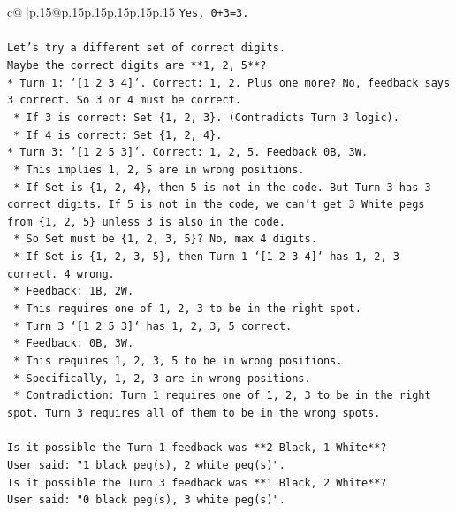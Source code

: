 \documentclass{article}
\begin{document}
{\begin{supertabular}{c@{$\;$}|p{.15\linewidth}@{}p{.15\linewidth}p{.15\linewidth}p{.15\linewidth}p{.15\linewidth}p{.15\linewidth}}
{{{\texttt{Yes, 0+3=3.} \\
\\ 
\texttt{Let's try a different set of correct digits.} \\
\texttt{Maybe the correct digits are **1, 2, 5**?} \\
\texttt{*   Turn 1: `{[}1 2 3 4{]}`. Correct: 1, 2. Plus one more? No, feedback says 3 correct. So 3 or 4 must be correct.} \\
\texttt{    *   If 3 is correct: Set \{1, 2, 3\}. (Contradicts Turn 3 logic).} \\
\texttt{    *   If 4 is correct: Set \{1, 2, 4\}.} \\
\texttt{*   Turn 3: `{[}1 2 5 3{]}`. Correct: 1, 2, 5. Feedback 0B, 3W.} \\
\texttt{    *   This implies 1, 2, 5 are in wrong positions.} \\
\texttt{    *   If Set is \{1, 2, 4\}, then 5 is not in the code. But Turn 3 has 3 correct digits. If 5 is not in the code, we can't get 3 White pegs from \{1, 2, 5\} unless 3 is also in the code.} \\
\texttt{    *   So Set must be \{1, 2, 3, 5\}? No, max 4 digits.} \\
\texttt{    *   If Set is \{1, 2, 3, 5\}, then Turn 1 `{[}1 2 3 4{]}` has 1, 2, 3 correct. 4 wrong.} \\
\texttt{        *   Feedback: 1B, 2W.} \\
\texttt{        *   This requires one of 1, 2, 3 to be in the right spot.} \\
\texttt{    *   Turn 3 `{[}1 2 5 3{]}` has 1, 2, 3, 5 correct.} \\
\texttt{        *   Feedback: 0B, 3W.} \\
\texttt{        *   This requires 1, 2, 3, 5 to be in wrong positions.} \\
\texttt{        *   Specifically, 1, 2, 3 are in wrong positions.} \\
\texttt{    *   Contradiction: Turn 1 requires one of 1, 2, 3 to be in the right spot. Turn 3 requires all of them to be in the wrong spots.} \\
\\ 
\texttt{Is it possible the Turn 1 feedback was **2 Black, 1 White**?} \\
\texttt{User said: "1 black peg(s), 2 white peg(s)".} \\
\texttt{Is it possible the Turn 3 feedback was **1 Black, 2 White**?} \\
\texttt{User said: "0 black peg(s), 3 white peg(s)".} \\
}}}
\end{supertabular}}
\end{document}
